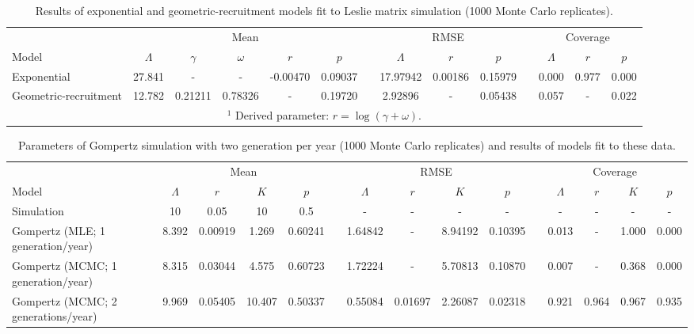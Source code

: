 \documentclass{article}
\begin{document}
\clearpage

\begin{table}
  \centering
  \footnotesize
  \caption{Results of exponential and geometric-recruitment models fit to Leslie matrix simulation (1000 Monte Carlo replicates).}
  \begin{tabular}{lccccccccccccc}
    \hline
    & \multicolumn{5}{c}{Mean} &&
    \multicolumn{3}{c}{RMSE} &&
    \multicolumn{3}{c}{Coverage} \\
    \cline{2-6}     \cline{8-10}    \cline{12-14}
    Model & $\Lambda$ & $\gamma$ & $\omega$ & $r$\footnotemark[1] & $p$ &&
    $\Lambda$ & $r$ & $p$ && 
    $\Lambda$ & $r$ & $p$ \\
    \hline
Exponential &
27.841	&-	&- 	&-0.00470	&0.09037	&&
17.97942	&0.00186 	&0.15979	&&
0.000 		&0.977 	&0.000 \\
Geometric-recruitment &
12.782	&0.21211	&0.78326	&-	&0.19720	&&
2.92896 	&- 	&0.05438	&&
0.057		&- 	&0.022 \\
  \hline
  \multicolumn{14}{c}{$^{1}$ Derived parameter: $r = \log(\gamma + \omega)$.}
  \end{tabular}
  \label{tab:simmat}
\end{table}
\clearpage

\begin{table}
  \centering
  \footnotesize
  \caption{Parameters of Gompertz simulation with two generation per year 
(1000 Monte Carlo replicates)
  and results of models fit to these data.}
  \begin{tabular}{lcccccccccccccc}
    \hline
    & \multicolumn{4}{c}{Mean} &&
    \multicolumn{4}{c}{RMSE} &&
    \multicolumn{4}{c}{Coverage} \\
    \cline{2-5}     \cline{7-10}    \cline{12-15}
    Model & $\Lambda$ & $r$ & $K$ & $p$ &&
    $\Lambda$ & $r$ & $K$ & $p$ && 
    $\Lambda$ & $r$ & $K$ & $p$ \\
    \hline
Simulation & 
10	&0.05	&10	&0.5	&&-	&-	&-	&-	&&-	&-	&-	&-\\
Gompertz (MLE; 1 generation/year) &
8.392	&0.00919	&1.269	&0.60241	&&
1.64842	&-	&8.94192	&0.10395	&&
0.013	&-	&1.000 	&0.000 \\
Gompertz (MCMC; 1 generation/year) &
8.315	&0.03044	&4.575	&0.60723	&&
1.72224	&-	&5.70813	&0.10870	&&
0.007	&-	&0.368		&0.000 \\
Gompertz (MCMC; 2 generations/year) &
9.969	&0.05405	&10.407	&0.50337	&&
0.55084	&0.01697	&2.26087	&0.02318	&&
0.921	&0.964	&0.967	&0.935 \\
  \hline
  \end{tabular}
  \label{tab:simgomp}
\end{table}
\end{document}
